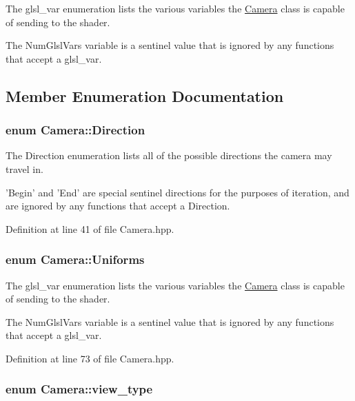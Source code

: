 The glsl\-\_\-var enumeration lists the various variables the \hyperlink{class_camera}{Camera} class is capable of sending to the shader. 

The Num\-Glsl\-Vars variable is a sentinel value that is ignored by any functions that accept a glsl\-\_\-var. 

\subsection{Member Enumeration Documentation}
\hypertarget{class_camera_a80cb65605322d27ad3b6d973484509ec}{
\subsubsection[{Direction}]{\setlength{\rightskip}{0pt plus 5cm}enum {\bf Camera\-::\-Direction}}}\label{class_camera_a80cb65605322d27ad3b6d973484509ec}


The Direction enumeration lists all of the possible directions the camera may travel in. 

'Begin' and 'End' are special sentinel directions for the purposes of iteration, and are ignored by any functions that accept a Direction. 

Definition at line 41 of file Camera.\-hpp.

\hypertarget{class_camera_a630738fd23098d44c0d15ee28d5649dd}{
\subsubsection[{Uniforms}]{\setlength{\rightskip}{0pt plus 5cm}enum {\bf Camera\-::\-Uniforms}}}\label{class_camera_a630738fd23098d44c0d15ee28d5649dd}


The glsl\-\_\-var enumeration lists the various variables the \hyperlink{class_camera}{Camera} class is capable of sending to the shader. 

The Num\-Glsl\-Vars variable is a sentinel value that is ignored by any functions that accept a glsl\-\_\-var. 

Definition at line 73 of file Camera.\-hpp.

\hypertarget{class_camera_afdccec6d447490dcc80ab6b99f21d0e5}{
\subsubsection[{view\-\_\-type}]{\setlength{\rightskip}{0pt plus 5cm}enum {\bf Camera\-::view\-\_\-type}}}\label{class_camera_afdccec6d447490dcc80ab6b99f21d0e5}


